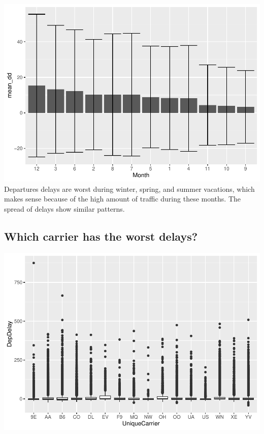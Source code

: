 \documentclass[]{article}
\newenvironment{Shaded}{\begin{snugshade}}{\end{snugshade}}
\newcommand{\DataTypeTok}[1]{\textcolor[rgb]{0.13,0.29,0.53}{#1}}
\newcommand{\DecValTok}[1]{\textcolor[rgb]{0.00,0.00,0.81}{#1}}
\newcommand{\KeywordTok}[1]{\textcolor[rgb]{0.13,0.29,0.53}{\textbf{#1}}}
\newcommand{\NormalTok}[1]{#1}
\newcommand{\OperatorTok}[1]{\textcolor[rgb]{0.81,0.36,0.00}{\textbf{#1}}}
\newcommand{\StringTok}[1]{\textcolor[rgb]{0.31,0.60,0.02}{#1}}
\begin{document}
\includegraphics{STA380_exercise_George_files/figure-latex/unnamed-chunk-8-1.pdf}
Departures delays are worst during winter, spring, and summer vacations,
which makes sense because of the high amount of traffic during these
months. The spread of delays show similar patterns.

\hypertarget{which-carrier-has-the-worst-delays}{%
\subsection{Which carrier has the worst
delays?}\label{which-carrier-has-the-worst-delays}}

\begin{Shaded}
\end{Shaded}

\includegraphics{STA380_exercise_George_files/figure-latex/unnamed-chunk-9-1.pdf}
\end{document}

